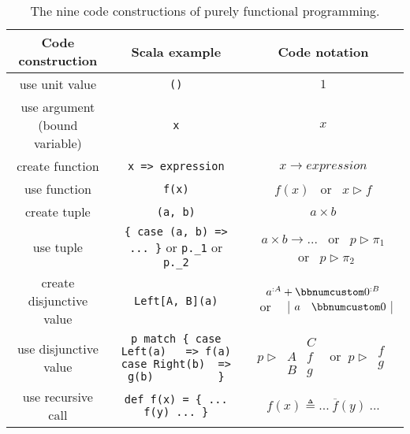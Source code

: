\begin{table}
\begin{centering}
\begin{tabular}{|c|c|c|}
\hline 
\textbf{\small{}Code construction} & \textbf{\small{}Scala example} & \textbf{\small{}Code notation}\tabularnewline
\hline 
\hline 
{\small{}use unit value} & {\small{}}\lstinline!()! & {\small{}$1$}\tabularnewline
\hline 
{\small{}use argument (bound variable)} & {\small{}}\lstinline!x! & {\small{}$x$}\tabularnewline
\hline 
{\small{}create function} & {\small{}}\lstinline!x => expression! & {\small{}$x\rightarrow expression$}\tabularnewline
\hline 
{\small{}use function} & {\small{}}\lstinline!f(x)! & $f(x)$ ~or~ $x\triangleright f$\tabularnewline
\hline 
{\small{}create tuple} & {\small{}}\lstinline!(a, b)! & {\small{}$a\times b$}\tabularnewline
\hline 
{\small{}use tuple} & {\small{}}\lstinline!{ case (a, b) => ... }!{\small{} or }\lstinline!p._1!{\small{}
or }\lstinline!p._2!{\small{} } & {\small{}$a\times b\rightarrow...$ ~or~ $p\triangleright\pi_{1}$
~or~ $p\triangleright\pi_{2}$}\tabularnewline
\hline 
{\small{}create disjunctive value} & {\small{}}\lstinline!Left[A, B](a)! & {\small{}}%
\begin{minipage}[c]{0.19\columnwidth}%
{\small{}\vspace{0.2\baselineskip}
$a^{:A}+\bbnum 0^{:B}$ ~or~~ $\begin{array}{|cc|}
a & \bbnum 0\end{array}$\vspace{0.2\baselineskip}
}%
\end{minipage}\tabularnewline
\hline 
{\small{}use disjunctive value} & {\small{}}%
\begin{minipage}[c]{0.33\columnwidth}%
{\small{}}\lstinline!p match { case Left(a)   => f(a)            case Right(b)  => g(b)          }!%
\end{minipage} & {\small{}}%
\begin{minipage}[c]{0.23\columnwidth}%
{\small{}\vspace{0.2\baselineskip}
$p\triangleright\,\begin{array}{|c||c|}
 & C\\
\hline A & f\\
B & g
\end{array}\,~\text{ or }~p\triangleright\,\begin{array}{||c|}
f\\
g
\end{array}$\vspace{0.2\baselineskip}
}%
\end{minipage}\tabularnewline
\hline 
{\small{}use recursive call} & {\small{}}\lstinline!def f(x) = { ... f(y) ... }! & {\small{}$f(x)\triangleq...~\overline{f}(y)~...$}\tabularnewline
\hline 
\end{tabular}
\par\end{centering}
\caption{The nine code constructions
of purely functional programming.\label{tab:nine-pure-code-constructions}}
\end{table}

